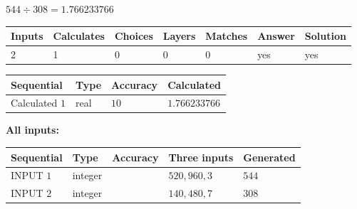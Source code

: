\documentclass{ctexart}
\begin{document}
 

$ %
544 \div  %
308=   %
1.766233766$
 
 
\noindent{}
 
 

 
   
   
   
   
\noindent\begin{tabular}{|l|l|l|l|l|l|l|}
 \hline
Inputs & Calculates & Choices & Layers & Matches & Answer & Solution \\ \hline
 2  & 
 1  & 
 0
  & 
 0  & 
 0  & 
  yes & 
  yes 
  \\ \hline
 \end{tabular}
   
   
   
   
\noindent{}
   
   
  
  
\noindent\begin{tabular}{|l|l|l|l|}
\hline
 Sequential & Type & Accuracy & Calculated \\ 
\hline
 
 
  Calculated $  1 $ & real & $  10  $ & 
 $ 1.766233766 $ 
 \\  \hline  
 \end{tabular}
   
   
   
   
\noindent\vspace{0.1in}\hspace{-0.08in} {\textbf{\Large{All inputs: }}}
   
   
  
  
\noindent\begin{tabular}{|l|l|l|l|l|}
\hline
 Sequential & Type & Accuracy & Three inputs & Generated \\ 
\hline
 
 
  INPUT $  1 $ & integer &  & $
 520
 , 
 960
 , 
 3
 $ & $ 544 $ 
 \\  \hline  
 
 
  INPUT $  2 $ & integer &  & $
 140
 , 
 480
 , 
 7
 $ & $ 308 $ 
 \\  \hline  
 \end{tabular}
   
   
  
\vspace{0.2in}
  
\end{document}
